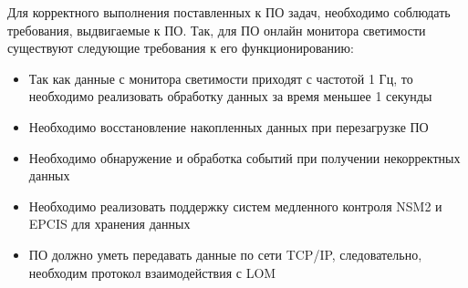   Для корректного выполнения поставленных к ПО задач, необходимо соблюдать требования, выдвигаемые к ПО. Так, для ПО онлайн монитора светимости существуют следующие требования к его функционированию:
\begin{itemize}
  \item Так как данные с монитора светимости приходят с частотой 1 Гц, то необходимо реализовать обработку данных за время меньшее 1 секунды
  \item Необходимо восстановление накопленных данных при перезагрузке ПО  
  \item Необходимо обнаружение и обработка событий при получении некорректных данных 
  \item Необходимо реализовать поддержку систем медленного контроля NSM2 и EPCIS для хранения данных
  \item ПО должно уметь передавать данные по сети TCP/IP, следовательно, необходим протокол взаимодействия с LOM
\end{itemize}
